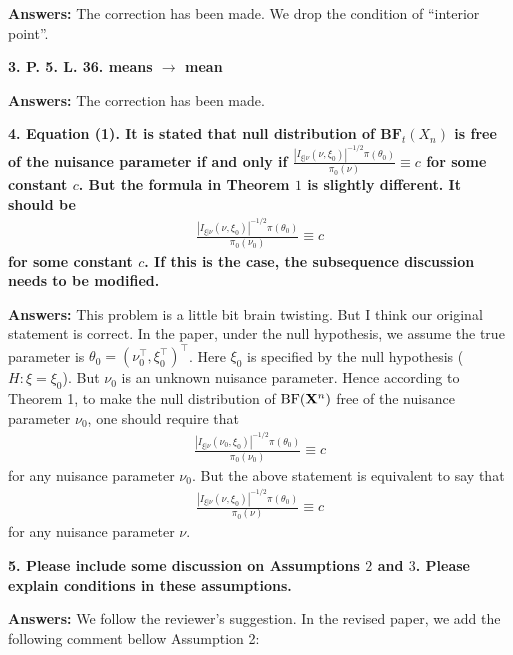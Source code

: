 \documentclass[11pt]{article}
\theoremstyle{plain}
\theoremstyle{definition}
\theoremstyle{remark}
\begin{document}
\textbf{Answers:}
The correction has been made.
We drop the condition of ``interior point''.

\textbf{
    3. P. 5. L. 36. means $\rightarrow$ mean
}

\textbf{Answers:}
The correction has been made.



\textbf{
4.
Equation (1).
It is stated that null distribution of $\textbf{BF}_t(X_n)$ is free of the nuisance parameter if and only if $\frac{\left| I_{\xi | \nu} (\nu, \xi_0) \right|^{-1/2} \pi(\theta_0) }{\pi_0(\nu)} \equiv c$ for some constant $c$. But the formula in Theorem $1$ is slightly different.
It should be
\begin{align*}
\frac{\left| I_{\xi | \nu} (\nu, \xi_0) \right|^{-1/2} \pi(\theta_0) }{\pi_0(\nu_0)} \equiv c
\end{align*}
for some constant $c$.
If this is the case, the subsequence discussion needs to be modified.
}

\textbf{Answers:}
This problem is a little bit brain twisting.
But I think our original statement is correct.
In the paper, under the null hypothesis, we assume the true parameter is $\theta_0 = (\nu_0^\top, \xi_0^\top)^\top$.
Here $\xi_0$ is specified by the null hypothesis ($H: \xi = \xi_0$).
But $\nu_0$ is an unknown nuisance parameter.
Hence according to Theorem 1, to make the null distribution of $\text{BF}(\mathbf{X}^n)$ free of the nuisance parameter $\nu_0$, one should require that
\begin{align*}
     \frac{\left| I_{\xi | \nu} (\nu_0, \xi_0) \right|^{-1/2} \pi(\theta_0) }{\pi_0(\nu_0)} \equiv c
\end{align*}
for any nuisance parameter $\nu_0$.
But the above statement is equivalent to say that
\begin{align*}
     \frac{\left| I_{\xi | \nu} (\nu, \xi_0) \right|^{-1/2} \pi(\theta_0) }{\pi_0(\nu)} \equiv c
\end{align*}
for any nuisance parameter $\nu$.



\textbf{
5.
Please include some discussion on Assumptions $2$ and $3$.
Please explain conditions in these assumptions.
}

\textbf{Answers:}
We follow the reviewer's suggestion.
In the revised paper, we add the following comment bellow Assumption 2:
\end{document}
